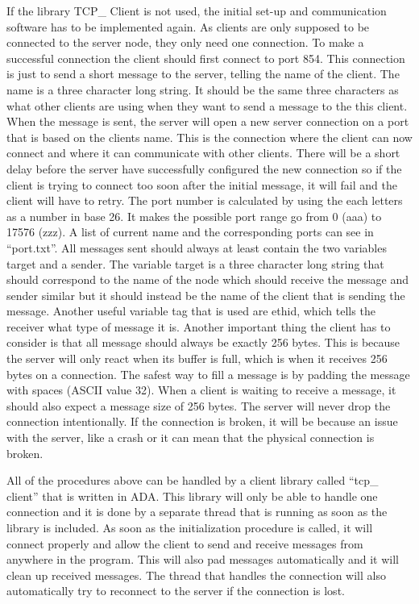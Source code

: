 If the library TCP\_ Client is not used, the initial set-up and communication software has to be implemented again. As clients are only supposed to be connected to the server node, they only need one connection. To make a successful connection the client should first connect to port 854. This connection is just to send a short message to the server, telling the name of the client. The name is a three character long string. It should be the same three characters as what other clients are using when they want to send a message to the this client. When the message is sent, the server will open a new server connection on a port that is based on the clients name.  This is the connection where the client can now connect and where it can communicate with other clients. There will be a short delay before the server have successfully configured the new connection so if the client is trying to connect too soon after the initial message, it will fail and the client will have to retry. The port number is calculated by using the each letters as a number in base 26. It makes the possible port range go from 0 (aaa) to 17576 (zzz). A list of current name and the corresponding ports can see in “port.txt”. All messages sent should always at least contain the two variables target and a sender. The variable target is a three character long string that should correspond to the name of the node which should receive the message and sender similar but it should instead be the name of the client that is sending the message. Another useful variable tag that is used are ethid, which tells the receiver what type of message it is. Another important thing the client has to consider is that all message should always be exactly 256 bytes. This is because the server will only react when its buffer is full, which is when it receives 256 bytes on a connection. The safest way to fill a message is by padding the message with spaces (ASCII value 32). When a client is waiting to receive a message, it should also expect a message size of 256 bytes. The server will never drop the connection intentionally. If the connection is broken, it will be because an issue with the server, like a crash or it can mean that the physical connection is broken. 

All of the procedures above can be handled by a client library called “tcp\_ client” that is written in ADA. This library will only be able to handle one connection and it is done by a separate thread that is running as soon as the library is included. As soon as the initialization procedure is called, it will connect properly and allow the client to send and receive messages from anywhere in the program. This will also pad messages automatically and it will clean up received messages. The thread that handles the connection will also automatically try to reconnect to the server if the connection is lost.

